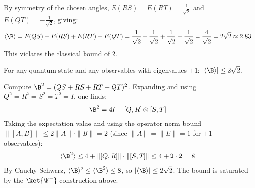 \documentclass[oneside]{academica}
\begin{document}
By symmetry of the chosen angles, $E(RS)=E(RT)=\frac{1}{\sqrt2}$ and $E(QT)=-\frac{1}{\sqrt2}$, giving:
\begin{equation*}
  \langle\B\rangle = E(QS)+E(RS)+E(RT)-E(QT)
  = \frac{1}{\sqrt2}+\frac{1}{\sqrt2}+\frac{1}{\sqrt2}+\frac{1}{\sqrt2}
  = \frac{4}{\sqrt{2}} = 2\sqrt{2}\approx 2.83
\end{equation*}
This violates the classical bound of 2.

\begin{theorem*}
  For any quantum state and any observables with eigenvalues $\pm1$: $|\langle\B\rangle|\le2\sqrt{2}$.
\end{theorem*}

\begin{proof*}
  Compute $\B^2=(QS+RS+RT-QT)^2$.
  Expanding and using $Q^2=R^2=S^2=T^2=I$, one finds:
  \begin{equation*}
    \B^2 = 4I - [Q,R]\otimes[S,T]
  \end{equation*}
  Taking the expectation value and using the operator norm bound $\|[A,B]\|\le2\|A\|\cdot\|B\|=2$ (since $\|A\|=\|B\|=1$ for $\pm1$-observables):
  \begin{equation*}
    \langle\B^2\rangle\le 4+\|[Q,R]\|\cdot\|[S,T]\|\le 4+2\cdot2=8
  \end{equation*}
  By Cauchy-Schwarz, $\langle\B\rangle^2\le\langle\B^2\rangle\le8$, so $|\langle\B\rangle|\le2\sqrt2$.
  The bound is saturated by the $\ket{\Psi^-}$ construction above.
\end{proof*}
\end{document}
